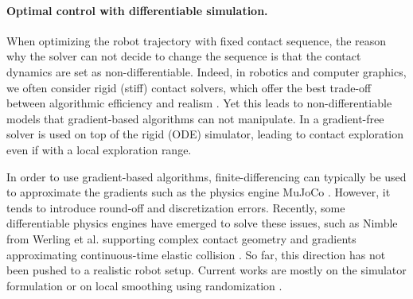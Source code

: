 


\paragraph{Optimal control with differentiable simulation.}

When optimizing the robot trajectory with fixed contact sequence, the reason why the solver can not decide to change the sequence is that the contact dynamics are set as non-differentiable. 
Indeed, in robotics and computer graphics, we often consider rigid (stiff) contact solvers, which offer the best trade-off between algorithmic efficiency and realism \cite{pybullet_coumans2019}.
Yet this leads to non-differentiable models that gradient-based algorithms can not manipulate. 
In \cite{hamalainen_2015} a gradient-free solver is used on top of the rigid (ODE) simulator, leading to contact exploration even if with a local exploration range.

In order to use gradient-based algorithms, finite-differencing can typically be used to approximate the gradients such as the physics engine MuJoCo \cite{mujoco}. However, it tends to introduce round-off and discretization errors.
Recently, some differentiable physics engines have emerged to solve these issues, such as Nimble from Werling et al. supporting complex contact geometry and gradients approximating continuous-time elastic collision \cite{werling_2021}.
So far, this direction has not been pushed to a realistic robot setup. 
Current works are mostly on the simulator formulation \cite{chainqueen_2019, difftaichi_2019} or on local smoothing using randomization \cite{tedrake_2022_differentiable, carpentier_fix_differentiable_OC}.



